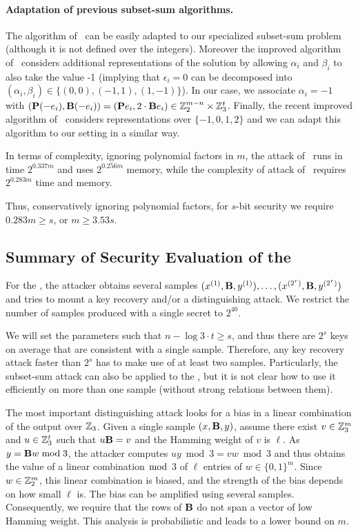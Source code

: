 \paragraph{Adaptation of previous subset-sum algorithms.}
The algorithm of~\cite{Howgrave-GrahamJ10} can be easily adapted
to our specialized subset-sum problem (although it is not defined over the integers).
Moreover the improved algorithm of~\cite{BeckerCJ11} considers additional representations
of the solution by allowing $\alpha_i$ and $\beta_i$ to also take the value -1
(implying that $\epsilon_i = 0$ can be decomposed into
$(\alpha_i,\beta_i) \in \{(0,0),(-1,1),(1,-1)\}$).
In our case, we associate $\alpha_i = -1$
with $(\mat{P}(-e_i), \mat{B}(-e_i)) = (\mat{P}e_i, 2 \cdot \mat{B}e_i)  \in \Z_2^{m-n} \times \Z_3^t$.
Finally, the recent improved algorithm of~\cite{BonnetainBSS20} considers representations over
$\{-1,0,1,2\}$ and we can adapt this algorithm to our setting in a similar way.

In terms of complexity, ignoring polynomial factors in $m$,
the attack of~\cite{Howgrave-GrahamJ10} runs in time $2^{0.337m}$ and uses $2^{0.256m}$ memory,
while the complexity of attack of~\cite{BonnetainBSS20} requires $2^{0.283m}$ time and memory.

Thus, conservatively ignoring polynomial factors, for $s$-bit security we require $0.283m \geq s$, or $m \geq 3.53 s$.

\subsection{Summary of Security Evaluation of the \ttwPRF}

For the \ttwPRF, the attacker obtains several samples 
$(x^{(1)},\mat{B},y^{(1)}) ,\ldots, (x^{(2^r)},
\mat{B},y^{(2^r)})$
and tries to
mount a key recovery and/or a distinguishing attack.
We restrict the number of samples produced with a single secret to $2^{40}$.

We will set the parameters such that $n - \log 3 \cdot t \geq s$,
and thus there are $2^s$ keys on average that are consistent with a single sample.
Therefore, any key recovery attack faster than $2^s$ has to make use of at least two samples.
Particularly, the subset-sum attack can also be applied to the \ttwPRF,
but it is not clear how to use it efficiently on more than one sample
(without strong relations between them).

The most important distinguishing attack looks for a bias in a linear combination
of the output over $\mathbb{Z}_3$.
Given a single sample $(x,\mat{B},y)$, assume there exist
$v \in \mathbb{Z}_3^m$ and $u \in \mathbb{Z}_3^t$ such that $u \mat{B} = v$ and the Hamming weight of $v$ is $\ell$.
As $y = \mat{B}w \bmod 3$, the attacker computes $uy \bmod 3 = vw \bmod 3$
and thus obtains the value of a linear combination $\bmod$ 3 of $\ell$ entries of $w \in \{0,1\}^m$.
Since $w \in \mathbb{Z}_2^m$, this linear combination is biased, 
and the strength of the bias depends on how small $\ell$ is.
The bias can be amplified using several samples.
Consequently, we require that the rows of $\mat{B}$ do not span a vector of low Hamming weight.
This analysis is probabilistic and leads to a lower bound on $m$.

